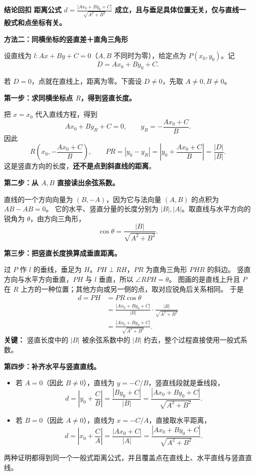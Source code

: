 \begin{proofbox}
	\medskip
	\textbf{\textcolor{CProof}{结论回扣}}
	\textbf{距离公式 $d=\frac{|Ax_0+By_0+C|}{\sqrt{A^2+B^2}}$ 成立，且与垂足具体位置无关，仅与直线一般式和点坐标有关。}

\medskip
\begin{minipage}{\linewidth}
\textbf{\textcolor{CProof}{方法二：同横坐标的竖直差＋直角三角形}}

\end{minipage}

设直线为 $l:Ax+By+C=0$（$A,B$ 不同时为零），给定点为 $P(x_0,y_0)$。记
\[
 D=Ax_0+By_0+C.
\]

若 $D=0$，点就在直线上，距离为零。下面设 $D\ne0$，先取 $A\ne0,B\ne0$。

\textbf{第一步：求同横坐标点 $R$，得到竖直长度。}

把 $x=x_0$ 代入直线方程，得到
\[
 Ax_0+By_R+C=0,
 \qquad y_R=-\frac{Ax_0+C}{B}.
\]
因此
\[
 R\left(x_0,-\frac{Ax_0+C}{B}\right),
 \qquad PR=|y_0-y_R|
 =\left|y_0+\frac{Ax_0+C}{B}\right|
 =\frac{|D|}{|B|}.
\]
这是竖直方向的长度，\textbf{还不是点到斜直线的距离}。

\begin{minipage}{\linewidth}
\textbf{第二步：从 $A,B$ 直接读出余弦系数。}

\end{minipage}

直线的一个方向向量为 $(B,-A)$，因为它与法向量 $(A,B)$ 的点积为 $AB-AB=0$。
它的水平、竖直分量的长度分别为 $|B|,|A|$。取直线与水平方向的锐角为 $\theta$，由方向三角形，
\[
 \cos\theta=\frac{|B|}{\sqrt{A^2+B^2}}.
\]

\textbf{第三步：把竖直长度换算成垂直距离。}

过 $P$ 作 $l$ 的垂线，垂足为 $H$。$PH\perp RH$，$PR$ 为直角三角形 $PHR$ 的斜边。
竖直方向与水平方向垂直，$PH$ 与 $l$ 垂直，所以 $\angle RPH=\theta$。
图画的是直线上升且 $P$ 在 $R$ 上方的一种位置；其他方向或另一侧的点，取对应锐角后关系相同。
于是
\[
 \begin{aligned}
 d=PH&=PR\cos\theta\\[3pt]
 &=\frac{|Ax_0+By_0+C|}{|B|}
   \cdot\frac{|B|}{\sqrt{A^2+B^2}}\\[3pt]
 &=\boxed{\frac{|Ax_0+By_0+C|}{\sqrt{A^2+B^2}}}.
 \end{aligned}
\]
\textbf{关键：} 竖直长度中的 $|B|$ 被余弦系数中的 $|B|$ 约去，整个过程直接使用一般式系数。

\textbf{第四步：补齐水平与竖直直线。}
\begin{itemize}[leftmargin=*,itemsep=.4em]
\item 若 $A=0$（因此 $B\ne0$），直线为 $y=-C/B$，竖直线段就是垂线段，
\[
 d=\left|y_0+\frac CB\right|
 =\frac{|By_0+C|}{|B|}
 =\frac{|Ax_0+By_0+C|}{\sqrt{A^2+B^2}}.
\]
\item 若 $B=0$（因此 $A\ne0$），直线为 $x=-C/A$，直接取水平距离，
\[
 d=\left|x_0+\frac CA\right|
 =\frac{|Ax_0+C|}{|A|}
 =\frac{|Ax_0+By_0+C|}{\sqrt{A^2+B^2}}.
\]
\end{itemize}
两种证明都得到同一个一般式距离公式，并且覆盖点在直线上、水平直线与竖直直线。

\end{proofbox}
